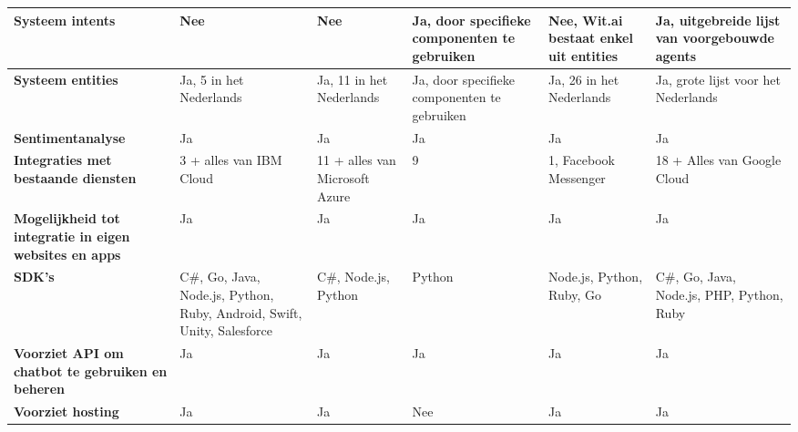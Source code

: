 \begin{center}
\begin{longtable}{| P{2.2cm} | p{2.2cm} |  p{2.2cm} | p{2.2cm} | p{2.2cm} | p{2.2cm} |}
        \textbf{Systeem intents}                                       & Nee                                                                     & Nee                & Ja, door specifieke componenten te gebruiken & Nee, Wit.ai bestaat enkel uit entities & Ja, uitgebreide lijst van voorgebouwde agents \\  \hline
        \textbf{Systeem entities}                                      & Ja, 5 in het Nederlands                                                 & Ja, 11 in het Nederlands       & Ja, door specifieke componenten te gebruiken & Ja, 26 in het Nederlands               & Ja, grote lijst voor het Nederlands           \\  \hline
        \textbf{Sentimentanalyse}                                      & Ja                                                                      & Ja                             & Ja                                           & Ja                                     & Ja                                            \\  \hline
        \textbf{Integraties met bestaande diensten}                    & 3 + alles van IBM Cloud                                                 & 11 + alles van Microsoft Azure & 9                                            & 1, Facebook Messenger                  & 18 + Alles van Google Cloud                   \\  \hline
        \textbf{Mogelijkheid tot integratie in eigen websites en apps} & Ja                                                                      & Ja                             & Ja                                           & Ja                                     & Ja                                            \\  \hline
        \textbf{SDK's}                                                 & C\#, Go, Java, Node.js, Python, Ruby, Android, Swift, Unity, Salesforce & C\#, Node.js, Python           & Python                                       & Node.js, Python, Ruby, Go              & C\#, Go, Java, Node.js, PHP, Python, Ruby     \\  \hline
        \textbf{Voorziet API om chatbot te gebruiken en beheren}       & Ja                                                                      & Ja                             & Ja                                           & Ja                                     & Ja                                            \\  \hline
        \textbf{Voorziet hosting}                                      & Ja                                                                      & Ja                             & Nee                                          & Ja                                     & Ja                                            \\  \hline

\end{longtable}
\end{center}
